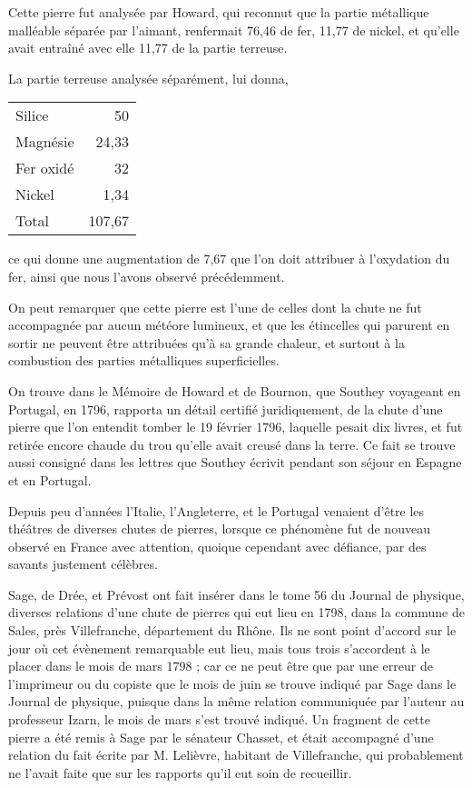 \documentclass[a4paper, 12pt, oneside, french]{article}
\begin{document}
Cette pierre fut analysée par Howard, qui reconnut que la partie métallique malléable séparée par l'aimant, renfermait 76,46 de fer, 11,77 de nickel, et qu'elle avait entraîné avec elle 11,77 de la partie terreuse.

La partie terreuse analysée séparément, lui donna,
\begin{table}[H]
    \centering
    \Fontauri
    \large
    \begin{tabular}{l r}
        Silice & 50 \\
        Magnésie & 24,33 \\
        Fer oxidé & 32 \\
        Nickel & 1,34 \\ \hline
        Total & 107,67 \\
    \end{tabular}
\end{table}
ce qui donne une augmentation de 7,67 que l'on doit attribuer à l'oxydation du fer, ainsi que nous l'avons observé précédemment.

On peut remarquer que cette pierre est l'une de celles dont la chute ne fut accompagnée par aucun météore lumineux, et que les étincelles qui parurent en sortir ne peuvent être attribuées qu'à sa grande chaleur, et surtout à la combustion des parties métalliques superficielles.

On trouve dans le Mémoire de Howard et de Bournon, que Southey voyageant en Portugal, en 1796, rapporta un détail certifié juridiquement, de la chute d'une pierre que l'on entendit tomber le 19 février 1796, laquelle pesait dix livres, et fut retirée encore chaude du trou qu'elle avait creusé dans la terre. Ce fait se trouve aussi consigné dans les lettres que Southey écrivit pendant son séjour en Espagne et en Portugal.

Depuis peu d'années l'Italie, l'Angleterre, et le Portugal venaient d'être les théâtres de diverses chutes de pierres, lorsque ce phénomène fut de nouveau observé en France avec attention, quoique cependant avec défiance, par des savants justement célèbres.

Sage, de Drée, et Prévost ont fait insérer dans le tome 56 du Journal de physique, diverses relations d'une chute de pierres qui eut lieu en 1798, dans la commune de Sales, près Villefranche, département du Rhône. Ils ne sont point d'accord sur le jour où cet évènement remarquable eut lieu, mais tous trois s'accordent à le placer dans le mois de mars 1798 ; car ce ne peut être que par une erreur de l'imprimeur ou du copiste que le mois de juin se trouve indiqué par Sage dans le Journal de physique, puisque dans la même relation communiquée par l'auteur au professeur Izarn, le mois de mars s'est trouvé indiqué. Un fragment de cette pierre a été remis à Sage par le sénateur Chasset, et était accompagné d'une relation du fait écrite par M. Lelièvre, habitant de Villefranche, qui probablement ne l'avait faite que sur les rapports qu'il eut soin de recueillir.
\end{document}
